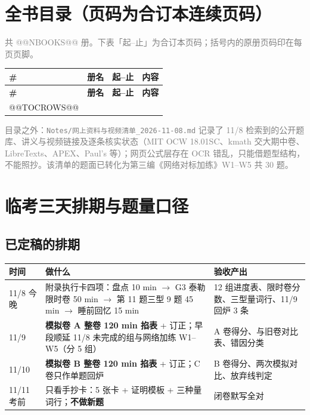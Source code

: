\documentclass[11pt,a4paper]{ctexart}
\begin{document}
\section{全书目录（页码为合订本连续页码）}

\noindent\textcolor{gray}{\footnotesize 共 @@NBOOKS@@ 册。下表「起--止」为合订本页码；括号内的原册页码印在每页页脚。}

\footnotesize
\setlength{\tabcolsep}{3pt}
\renewcommand{\arraystretch}{0.92}
\begin{longtable}{@{}p{0.75cm}p{5.3cm}p{1.9cm}p{7.4cm}@{}}
\toprule
\textbf{\#} & \textbf{册名} & \textbf{起--止} & \textbf{内容} \\
\midrule
\endfirsthead
\toprule
\textbf{\#} & \textbf{册名} & \textbf{起--止} & \textbf{内容} \\
\midrule
\endhead
\bottomrule
\endlastfoot
@@TOCROWS@@
\end{longtable}
\normalsize

\noindent\textcolor{gray}{\footnotesize 目录之外：\texttt{Notes/网上资料与视频清单\_2026-11-08.md} 记录了 11/8 检索到的公开题库、讲义与视频链接及逐条核实状态（MIT OCW 18.01SC、kmath 交大期中卷、LibreTexts、APEX、Paul's 等）；网页公式层存在 OCR 错乱，只能借题型结构，不能照抄。该清单的题面已转化为第三编《网络对标加练》W1--W5 共 30 题。}

\newpage
\section{临考三天排期与题量口径}

\subsection{已定稿的排期}
\begin{longtable}{@{}p{2.1cm}p{5.0cm}p{7.9cm}@{}}
\toprule
\textbf{时间} & \textbf{做什么} & \textbf{验收产出} \\
\midrule
11/8 今晚 & 附录执行卡四项：盘点 10 min $\to$ G3 泰勒限时卷 50 min $\to$ 第 11 题三型 9 题 45 min $\to$ 睡前回忆 15 min & 12 组进度表、限时卷分数、三型量词行、11/9 回炉 3 条 \\
11/9 & \textbf{模拟卷 A 整卷 120 min 掐表} + 订正；早段顺延 11/8 未完成的组与网络加练 W1--W5（分 5 组） & A 卷得分、与旧卷对比表、错因分类 \\
11/10 & \textbf{模拟卷 B 整卷 120 min 掐表} + 订正；C 卷只作单题回炉 & B 卷得分、两次模拟对比、放弃线判定 \\
11/11 考前 & 只看手抄卡：5 张卡 + 证明模板 + 三种量词行；\textbf{不做新题} & 闭卷默写全对 \\
\bottomrule
\end{longtable}
\end{document}

